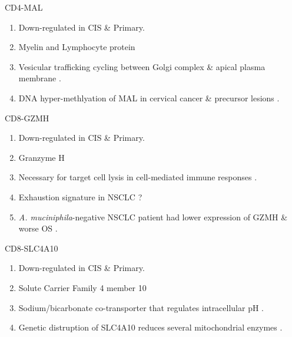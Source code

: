 \documentclass{beamer}
\begin{document}
\begin{frame}[allowframebreaks]
        \begin{block}{CD4-MAL}
            \begin{enumerate}
                \item Down-regulated in CIS \& Primary.
                \item Myelin and Lymphocyte protein
                \item Vesicular trafficking cycling between Golgi complex \& apical plasma membrane \cite{MAL-1}.
                \item DNA hyper-methlyation of MAL in cervical cancer \& precursor lesions \cite{MAL-2}.
            \end{enumerate}
        \end{block}

        \begin{block}{CD8-GZMH}
            \begin{enumerate}
                \item Down-regulated in CIS \& Primary.
                \item Granzyme H
                \item Necessary for target cell lysis in cell-mediated immune responses \cite{GZMH-1, GZMH-2}.
                \item Exhaustion signature in NSCLC \cite{GZMH-3} ?
                \item \textit{A. muciniphila}-negative NSCLC patient had lower expression of GZMH \& worse OS \cite{GZMH-4}.
            \end{enumerate}
        \end{block}

        \begin{block}{CD8-SLC4A10}
            \begin{enumerate}
                \item Down-regulated in CIS \& Primary.
                \item Solute Carrier Family 4 member 10
                \item Sodium/bicarbonate co-transporter that regulates intracellular pH \cite{SLC4A10-1}.
                \item Genetic distruption of SLC4A10 reduces several mitochondrial enzymes \cite{SLC4A10-2}.
            \end{enumerate}
        \end{block}


\end{frame}
\end{document}
